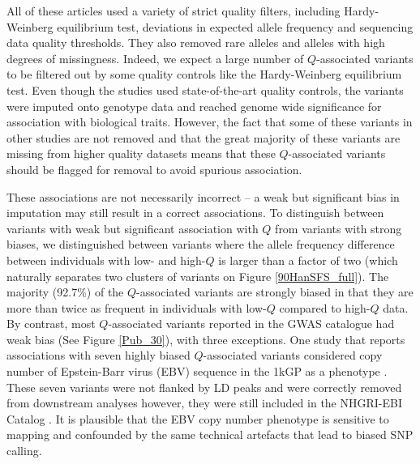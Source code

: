 \documentclass[9pt,article]{template}
\begin{document}
All of these articles used a variety of strict quality filters, including Hardy-Weinberg equilibrium test, deviations in expected allele frequency and sequencing data quality thresholds.
They also removed rare alleles and alleles with high degrees of missingness.
Indeed, we expect a large number of $Q$-associated variants to be filtered out by some quality controls like the Hardy-Weinberg equilibrium test.
Even though the studies used state-of-the-art quality controls, the variants were imputed onto genotype data and reached genome wide significance for association with biological traits.
However, the fact that some of these variants in other studies are not removed and that the great majority of these variants are missing from higher quality datasets means that these $Q$-associated variants should be flagged for removal to avoid spurious association.

These associations are not necessarily incorrect -- a weak but significant bias in imputation may still result in a correct associations.
To distinguish between variants with weak but significant association with $Q$ from variants with strong biases, we distinguished between variants where the allele frequency difference between individuals with low- and high-$Q$ is larger than a factor of two (which naturally separates two clusters of variants on Figure \ref{90HanSFS_full}).
The majority (92.7\%) of the $Q$-associated variants are strongly biased in that they are more than twice as frequent in individuals with low-$Q$ compared to high-$Q$ data.
By contrast, most $Q$-associated variants reported in the GWAS catalogue had weak bias (See Figure \ref{Pub_30}), with three exceptions.
One study that reports associations with seven highly biased $Q$-associated variants considered copy number of Epstein-Barr virus (EBV) sequence in the 1kGP as a phenotype \citep{Mandage2017}. 
These seven variants were not flanked by LD peaks and were correctly removed from downstream analyses however, they were still included in the NHGRI-EBI Catalog \citep{Mandage2017}.
It is plausible that the EBV copy number phenotype is sensitive to mapping and confounded by the same technical artefacts that lead to biased SNP calling.
\end{document}
